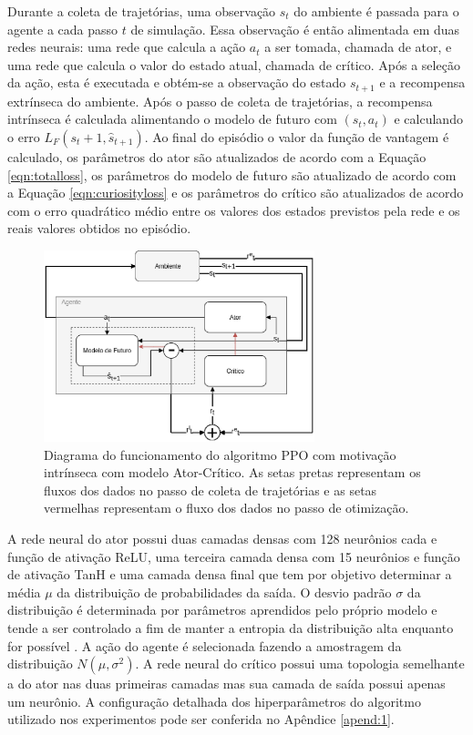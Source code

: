 Durante a coleta de trajetórias, uma observação $s_t$ do ambiente é passada para o agente a cada passo $t$ de simulação. Essa observação é então alimentada em duas redes neurais: uma rede que calcula a ação $a_t$ a ser tomada, chamada de ator, e uma rede que calcula o valor do estado atual, chamada de crítico. Após a seleção da ação, esta é executada e obtém-se a observação do estado $s_{t+1}$ e a recompensa extrínseca do ambiente. Após o passo de coleta de trajetórias, a recompensa intrínseca é calculada alimentando o modelo de futuro com $(s_t, a_t)$ e calculando o erro $L_F(s_t+1, \hat{s}_{t+1})$. Ao final do episódio o valor da função de vantagem é calculado, os parâmetros do ator são atualizados de acordo com a Equação \ref{eqn:totalloss}, os parâmetros do modelo de futuro são atualizado de acordo com a Equação \ref{eqn:curiosityloss} e os parâmetros do crítico são atualizados de acordo com o erro quadrático médio entre os valores dos estados previstos pela rede e os reais valores obtidos no episódio.

\begin{figure}[ht]
 \centering
  \includegraphics[width=0.70\textwidth]{./fig/ppomotivateddiagram}
  \captionsetup{width=1\textwidth}
  \caption[Diagrama do funcionamento do algoritmo PPO com motivação intrínseca com modelo Ator-Crítico.]{Diagrama do funcionamento do algoritmo PPO com motivação intrínseca com modelo Ator-Crítico. As setas pretas representam os fluxos dos dados no passo de coleta de trajetórias e as setas vermelhas representam o fluxo dos dados no passo de otimização.}
 \label{fig:ppomotivated}
\end{figure}

A rede neural do ator possui duas camadas densas com 128 neurônios cada e função de ativação ReLU, uma terceira camada densa com 15 neurônios e função de ativação TanH e uma camada densa final que tem por objetivo determinar a média $\mu$ da distribuição de probabilidades da saída. O desvio padrão $\sigma$ da distribuição é determinada por parâmetros aprendidos pelo próprio modelo e tende a ser controlado a fim de manter a entropia da distribuição alta enquanto for possível \cite{williamspeng}. A ação do agente é selecionada fazendo a amostragem da distribuição $N(\mu, \sigma^2)$. A rede neural do crítico possui uma topologia semelhante a do ator nas duas primeiras camadas mas sua camada de saída possui apenas um neurônio. A configuração detalhada dos hiperparâmetros do algoritmo utilizado nos experimentos pode ser conferida no Apêndice \ref{apend:1}.

